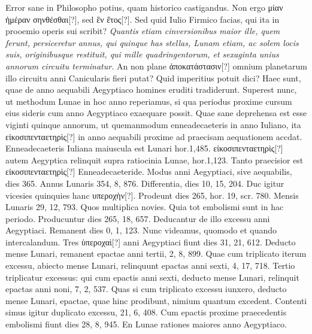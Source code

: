 Error sane in Philosopho potius,
quam historico castigandus.
Non ergo \textgreek{μίαν ἡμέραν σηνθέσθαι}[?], sed
\textgreek{ἓν ἔτος}[?].
Sed quid Iulio Firmico facias, qui ita in prooemio %
 operis sui
scribit?
\textit{Quantis etiam cinversionibus maior ille, quem ferunt,
 persiceretur
annus, qui quinque has stellas, Lunam etiam, ac solem locis
suis, originibusque restituit, qui mille quadringentorum, et sexaginta
unius annorum circuitu terminatur.}
An non plane \textgreek{ἀποκατάστασιν}[?] omnium
planetarum illo circuitu anni Canicularis fieri putat?
Quid
imperitius potuit dici?
Haec sunt, quae de anno aequabili Aegyptiaco
homines eruditi tradiderunt.
Superest nunc, ut methodum Lunae in
hoc anno reperiamus, si qua periodus proxime cursum eius sideris
cum anno Aegyptiaco exaequare possit.
Quae sane deprehensa est esse
viginti quinque annorum, ut quemanmodum enneadecaeteris in anno
Iuliano, ita \textgreek{εἰκοσιπενταετηρὶς}[?]
 in anno aequabili proxime ad praecisam
aequationem accdat.
Enneadecaeteris Iuliana maiuscula est Lunari
hor.1,485.
\textgreek{εἰκοσιπενταετηρὶς}[?]
 autem Aegyptica relinquit supra ratiocinia
Lunae, hor.1,123.
Tanto praecisior est \textgreek{εἰκοσιπενταετηρὶς}[?] Enneadecaeteride.
Modus anni Aegyptiaci, sive aequabilis, dies 365.
Annus Lunaris
354, 8, 876.
Differentia, dies 10, 15, 204.
Duc igitur vicesies
quinquies hanc \textgreek{υπεροχὴν}[?].
Prodeunt dies 265, hor. 19, scr. 780.
Mensis
Lunaris 29, 12, 793.
Quos multiplica novies.
Quia tot embolismi sunt
in hac periodo.
Producuntur dies 265, 18, 657.
Deducantur de illo excessu
anni Aegyptiaci.
%
Remanent dies 0, 1, 123.
Nunc videamus,
quomodo et quando intercalandum.
Tres \textgreek{ὑπεροχαὶ}[?] anni Aegyptiaci
fiunt dies 31, 21, 612.
Deducto mense Lunari, remanent epactae anni
tertii, 2, 8, 899.
Quae cum triplicato iterum excessu, abiecto mense
Lunari, relinquunt epactas anni sexti, 4, 17, 718.
Tertio triplicatur
excessus: qui cum epactis anni sexti, deducto mense Lunari,
relinquit epactas anni noni, 7, 2, 537.
Quas si cum triplicato
excessu iunxero, deducto mense Lunari, epactae, quae hinc prodibunt,
nimium quantum excedent.
Contenti simus igitur duplicato
excessu, 21, 6, 408.
Cum epactis proxime praecedentis embolismi
fiunt dies 28, 8, 945.
En Lunae rationes maiores anno Aegyptiaco.
